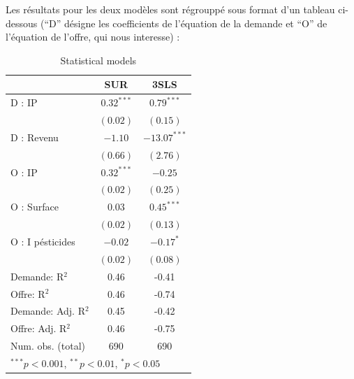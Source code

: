\documentclass[11pt,]{article}
\begin{document}
Les résultats pour les deux modèles sont régrouppé sous format d'un
tableau ci-dessous (``D'' désigne les coefficients de l'équation de la
demande et ``O'' de l'équation de l'offre, qui nous interesse) :

\FloatBarrier

\begin{table}[!htbp]
\begin{center}
\begin{tabular}{l c c }
\hline
 & SUR & 3SLS \\
\hline
D : IP              & $0.32^{***}$ & $0.79^{***}$   \\
                    & $(0.02)$     & $(0.15)$       \\
D : Revenu          & $-1.10$      & $-13.07^{***}$ \\
                    & $(0.66)$     & $(2.76)$       \\
O : IP              & $0.32^{***}$ & $-0.25$        \\
                    & $(0.02)$     & $(0.25)$       \\
O : Surface         & $0.03$       & $0.45^{***}$   \\
                    & $(0.02)$     & $(0.13)$       \\
O : I pésticides    & $-0.02$      & $-0.17^{*}$    \\
                    & $(0.02)$     & $(0.08)$       \\
\hline
Demande: R$^2$      & 0.46         & -0.41          \\
Offre: R$^2$        & 0.46         & -0.74          \\
Demande: Adj. R$^2$ & 0.45         & -0.42          \\
Offre: Adj. R$^2$   & 0.46         & -0.75          \\
Num. obs. (total)   & 690          & 690            \\
\hline
\multicolumn{3}{l}{\scriptsize{$^{***}p<0.001$, $^{**}p<0.01$, $^*p<0.05$}}
\end{tabular}
\caption{Statistical models}
\label{table : sur et 3sls}
\end{center}
\end{table}

\FloatBarrier
\end{document}
